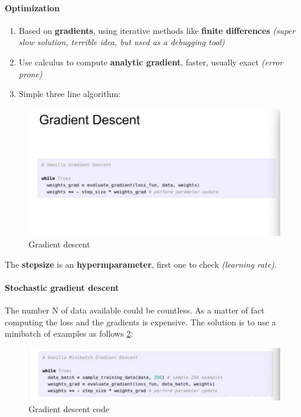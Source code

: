 \documentclass[11pt]{article}
\begin{document}
\paragraph{Optimization}
\begin{enumerate}
    \item	Based on \textbf{gradients}, using iterative methods like \textbf{finite differences} \textit{(super slow solution, terrible idea, but used as a debugging tool)}

\item	Use calculus to compute \textbf{analytic gradient}, faster, usually exact \textit{(error prone)}

\item	Simple three line algorithm:

\end{enumerate}{}
\begin{figure}[h]
\centering
\captionsetup{justification=centering}
\includegraphics[width=0.75\linewidth]{L217.pdf}
\caption{ Gradient descent}
\label{fig:L217}
\end{figure}
The \textbf{stepsize} is an \textbf{hypermparameter}, first one to check \textit{(learning rate)}.
\paragraph{Stochastic gradient descent}
The number N of data available could be countless. As a matter of fact computing the loss and the gradients is expensive. The solution is to use  a minibatch of examples as follows \ref{fig:L218}:
\clearpage
\begin{figure}[h]
\centering
\captionsetup{justification=centering}
\includegraphics[width=0.75\linewidth]{L218.pdf}
\caption{ Gradient descent code}
\label{fig:L218}
\end{figure}
\end{document}
